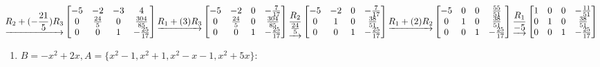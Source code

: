 \documentclass[
  11,
]{article}
\providecommand{\tightlist}{%
  \setlength{\itemsep}{0pt}\setlength{\parskip}{0pt}}
\begin{document}
\[\underrightarrow{ R_2 + (- \frac{21}{5})R_3 }
\left[\begin{matrix}-5 & -2 & -3 & 4\\0 & \frac{24}{5} & 0 & \frac{304}{85}\\0 & 0 & 1 & - \frac{25}{17}\end{matrix}\right]
\underrightarrow{ R_1 + (3)R_3 }
\\
\left[\begin{matrix}-5 & -2 & 0 & - \frac{7}{17}\\0 & \frac{24}{5} & 0 & \frac{304}{85}\\0 & 0 & 1 & - \frac{25}{17}\end{matrix}\right]
\underrightarrow{ \frac{R_2}{\frac{24}{5}} }
\left[\begin{matrix}-5 & -2 & 0 & - \frac{7}{17}\\0 & 1 & 0 & \frac{38}{51}\\0 & 0 & 1 & - \frac{25}{17}\end{matrix}\right]
\underrightarrow{ R_1 + (2)R_2 }
\\
\left[\begin{matrix}-5 & 0 & 0 & \frac{55}{51}\\0 & 1 & 0 & \frac{38}{51}\\0 & 0 & 1 & - \frac{25}{17}\end{matrix}\right]
\underrightarrow{ \frac{R_1}{-5} }
\left[\begin{matrix}1 & 0 & 0 & - \frac{11}{51}\\0 & 1 & 0 & \frac{38}{51}\\0 & 0 & 1 & - \frac{25}{17}\end{matrix}\right]
  \]

\begin{enumerate}
\def\labelenumi{\alph{enumi})}
\setcounter{enumi}{1}
\tightlist
\item
  \(B = -x^2+2x, A = \{x^2-1, x^2+1, x^2-x-1, x^2+5x\}\):
\end{enumerate}
\end{document}
